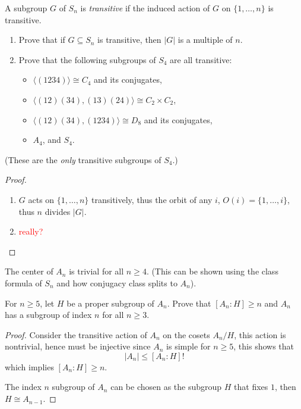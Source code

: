 \documentclass[openany]{book}
\begin{document}
    \begin{prob}[4.12]
        A subgroup $G$ of $S_n$ is \emph{transitive} if the induced action of $G$ on $\{1,\ldots,n\}$ is transitive.

    \begin{enumerate}
        \item Prove that if $G \subseteq S_n$ is transitive, then $|G|$ is a multiple of $n$.
        \item Prove that the following subgroups of $S_4$ are all transitive:
        \begin{itemize}
            \item $\langle (1234)\rangle \cong C_4$ and its conjugates,
            \item $\langle (12)(34), (13)(24)\rangle \cong C_2 \times C_2$,
            \item $\langle (12)(34), (1234)\rangle \cong D_8$ and its conjugates,
            \item $A_4$, and $S_4$.
        \end{itemize}
    \end{enumerate}
    (These are the \emph{only} transitive subgroups of $S_4$.)
    \end{prob}
\begin{proof}
    \begin{enumerate}
        \item $G$ acts on $\{1,\dots, n\}$ transitively, thus the orbit of any $i$, $O(i)=\{1,\dots, i\}$, thus $n$ divides $|G|$.
        \item  \textcolor{red}{really?}
    \end{enumerate}
\end{proof}


\begin{prop}[4.14]
    The center of $A_n$ is trivial for all $n\geq 4$. (This can be shown using the class formula of $S_n$ and how conjugacy class splits to $A_n$).
\end{prop}

\begin{prob}[4.18]
    For \( n \geq 5 \), let \( H \) be a proper subgroup of \( A_n \). Prove that \([A_n : H] \geq n\) and \( A_n \) has a subgroup of index \( n \) for all \( n \geq 3 \).
    \end{prob}
\begin{proof}
    Consider the transitive action of $A_n$ on the cosets $A_n/H$, this action is nontrivial, hence must be injective since $A_n$ is simple for $n\geq 5$, this shows that 
    \begin{equation*}
        |A_n|\leq[A_n:H]!
    \end{equation*}
    which implies $[A_n:H]\geq n$.

    The index $n$ subgroup of $A_n$ can be chosen as the subgroup $H$ that fixes $1$, then $H\cong A_{n-1}$.
\end{proof}
    
\end{document}
